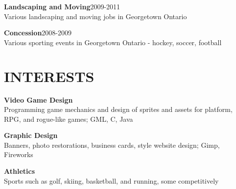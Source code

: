 \documentclass[line, margin]{res}
\begin{document}
\begin{resume}
{	\textbf{Landscaping and Moving}{\color{darkgrey}\hfill 2009-2011 \\[3pt]
	Various landscaping and moving jobs in Georgetown Ontario}

	\textbf{Concession}{\color{darkgrey}\hfill 2008-2009 \\[3pt]
	Various sporting events in Georgetown Ontario - hockey, soccer, football\\}
}

\section{INTERESTS}
{
	\textbf{Video Game Design}\\[3pt]
	{\color{darkgrey}Programming game mechanics and design of sprites and assets for platform, RPG, and rogue-like games; GML, C, Java}

	\textbf{Graphic Design}\\[3pt]
	{\color{darkgrey}Banners, photo restorations, business cards, style website design; Gimp, Fireworks}

	\textbf{Athletics}\\[3pt]
	{\color{darkgrey}Sports such as golf, skiing, basketball, and running, some competitively}
}

\end{resume}
\end{document}
